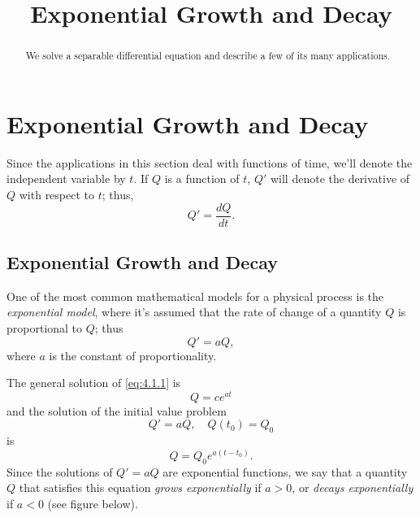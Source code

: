 \documentclass{ximera}
\title{Exponential Growth and Decay}%
\begin{document}
\begin{abstract}
We solve a separable differential equation and describe a few of its many applications.
\end{abstract}

\maketitle

\section*{Exponential Growth and Decay}

Since the applications in this section deal with functions of time, we'll
 denote the independent variable by $t$. If $Q$ is a function of
$t$, $Q'$ will denote the derivative of $Q$ with respect to $t$;
thus,
$$
Q'=\frac{dQ}{dt}.
$$

\subsection*{Exponential Growth and Decay}

One of the most common mathematical models for a physical process is
the \textit{exponential model}, where it's assumed that the rate
of change of a quantity $Q$ is proportional to $Q$; thus
\begin{equation} \label{eq:4.1.1}
Q'=aQ,
\end{equation}
 where $a$ is the constant of proportionality.

The general solution of
\eqref{eq:4.1.1} is
$$
Q=ce^{at}
$$
 and the solution of the initial value problem
$$
Q'=aQ, \quad Q(t_0)=Q_0
$$
 is
\begin{equation} \label{eq:4.1.2}
Q=Q_0e^{a(t-t_0)}.
\end{equation}
Since the solutions of $Q'=aQ$ are exponential functions, we say that
a
quantity $Q$ that satisfies this equation \textit{grows exponentially} if
$a > 0$, or \textit{decays exponentially} if $a < 0$ (see figure below).


\begin{center}
\end{center}

\end{document}
